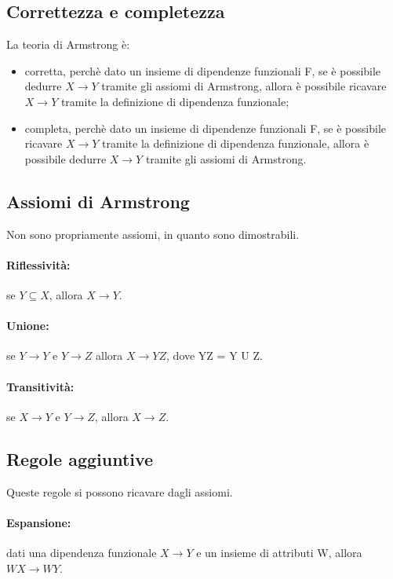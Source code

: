\subsection{Correttezza e completezza}

La teoria di Armstrong è:

\begin{itemize}
    \item corretta, perchè dato un insieme di dipendenze funzionali F, se è possibile dedurre $X \rightarrow Y$ tramite gli assiomi di Armstrong, allora è possibile ricavare $X \rightarrow Y$ tramite la definizione di dipendenza funzionale;
    \item completa, perchè dato un insieme di dipendenze funzionali F, se è possibile ricavare $X \rightarrow Y$ tramite la definizione di dipendenza funzionale, allora è possibile dedurre $X \rightarrow Y$ tramite gli assiomi di Armstrong.
\end{itemize}

\subsection{Assiomi di Armstrong}

Non sono propriamente assiomi, in quanto sono dimostrabili.

\paragraph{Riflessività:} se $Y \subseteq X$, allora $X \rightarrow Y$.

\paragraph{Unione:} se $Y \rightarrow Y$ e $Y \rightarrow Z$ allora $X \rightarrow YZ$, dove YZ = Y U Z.

\paragraph{Transitività:} se $X \rightarrow Y$ e $Y \rightarrow Z$, allora $X \rightarrow Z$.

\subsection{Regole aggiuntive}

Queste regole si possono ricavare dagli assiomi.

\paragraph{Espansione:} dati una dipendenza funzionale $X \rightarrow Y$ e un insieme di attributi W, allora $WX \rightarrow WY$.

